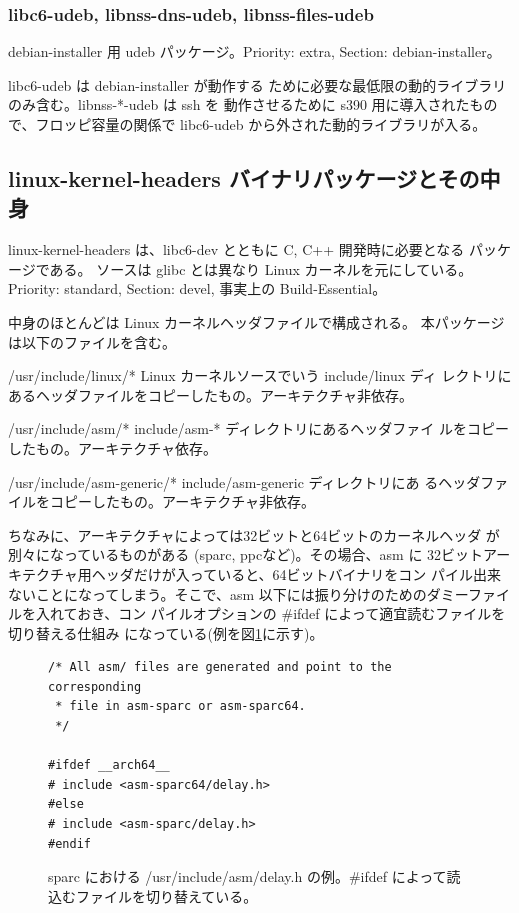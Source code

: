 \documentclass[mingoth]{jsarticle}
\newenvironment{gdescription}%
{%
   \begin{list}{}%
   {%
      \setlength{\itemindent}{0mm}
      \setlength{\leftmargin}{45mm}%
      \setlength{\rightmargin}{0zw}%
      \setlength{\labelsep}{4mm}%
      \setlength{\labelwidth}{4cm}%
      \setlength{\itemsep}{0em}%
      \setlength{\parsep}{0cm}%
      \setlength{\listparindent}{0cm}%
      \let\makelabel\gdescriptionlabel
   }
}{%
   \end{list}%
}
\newcommand*\gdescriptionlabel[1]{\hspace\labelsep\normalfont\bfseries #1}
\begin{document}
  \subsubsection{libc6-udeb, libnss-dns-udeb, libnss-files-udeb}

    debian-installer 用 udeb パッケージ。Priority: extra, Section:
    debian-installer。

    libc6-udeb は debian-installer が動作する
    ために必要な最低限の動的ライブラリのみ含む。libnss-*-udeb は ssh を
    動作させるために s390 用に導入されたもので、フロッピ容量の関係で
    libc6-udeb から外された動的ライブラリが入る。

\subsection{linux-kernel-headers バイナリパッケージとその中身}

  linux-kernel-headers は、libc6-dev とともに C, C++ 開発時に必要となる
  パッケージである。
  ソースは glibc とは異なり Linux カーネルを元にしている。Priority:
  standard, Section: devel, 事実上の Build-Essential。

  中身のほとんどは Linux カーネルヘッダファイルで構成される。
  本パッケージは以下のファイルを含む。

  \begin{gdescription}
    \item[/usr/include/linux/*] Linux カーネルソースでいう include/linux ディ
	       レクトリにあるヘッダファイルをコピーしたもの。アーキテクチャ非依存。
    \item[/usr/include/asm/*] include/asm-* ディレクトリにあるヘッダファイ
	       ルをコピーしたもの。アーキテクチャ依存。
    \item[/usr/include/asm-generic/*] include/asm-generic ディレクトリにあ
	       るヘッダファイルをコピーしたもの。アーキテクチャ非依存。
  \end{gdescription}

  ちなみに、アーキテクチャによっては32ビットと64ビットのカーネルヘッダ
  が別々になっているものがある (sparc, ppcなど)。その場合、asm に
  32ビットアーキテクチャ用ヘッダだけが入っていると、64ビットバイナリをコン
  パイル出来ないことになってしまう。そこで、asm 以下には振り分けのためのダミーファイルを入れておき、コン
  パイルオプションの \#ifdef によって適宜読むファイルを切り替える仕組み
  になっている(例を図\ref{asm-sparc}に示す)。

\begin{figure}
\begin{Verbatim}[frame=single]
/* All asm/ files are generated and point to the corresponding
 * file in asm-sparc or asm-sparc64.
 */

#ifdef __arch64__
# include <asm-sparc64/delay.h>
#else
# include <asm-sparc/delay.h>
#endif
\end{Verbatim}
\caption{sparc における /usr/include/asm/delay.h の例。\#ifdef によって読込むファイルを切り替えている。}
\label{asm-sparc}
\end{figure}
\end{document}
